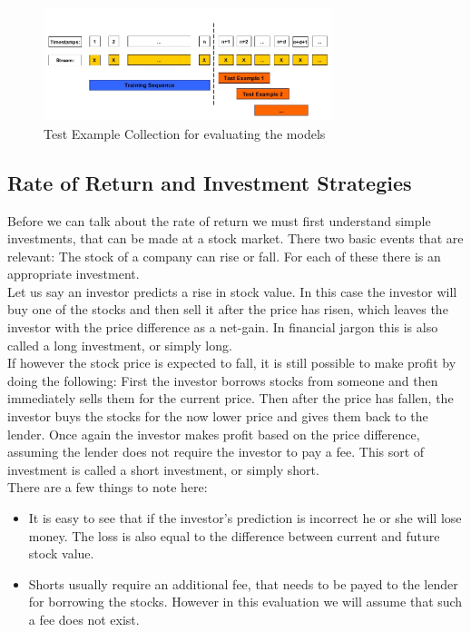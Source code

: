 \begin{figure}[h]
	\centering
  	\includegraphics[width=0.75\textwidth]{testData}
	\caption{Test Example Collection for evaluating the models}
	\label{fig_testData}
\end{figure}

\subsection{Rate of Return and Investment Strategies}
\label{subsec_investmentStrageties}
Before we can talk about the rate of return we must first understand simple investments, that can be made at a stock market. There two basic events that are relevant: The stock of a company can rise or fall. For each of these there is an appropriate investment. \\
Let us say an investor predicts a rise in stock value. In this case the investor will buy one of the stocks and then sell it after the price has risen, which leaves the investor with the price difference as a net-gain. In financial jargon this is also called a long investment, or simply long. \\
If however the stock price is expected to fall, it is still possible to make profit by doing the following: First the investor borrows stocks from someone and then immediately sells them for the current price. Then after the price has fallen, the investor buys the stocks for the now lower price and gives them back to the lender. Once again the investor makes profit based on the price difference, assuming the lender does not require the investor to pay a fee. This sort of investment is called a short investment, or simply short. \\
There are a few things to note here:
\begin{itemize}
	\item It is easy to see that if the investor's prediction is incorrect he or she will lose money. The loss is also equal to the difference between current and future stock value.
	\item Shorts usually require an additional fee, that needs to be payed to the lender for borrowing the stocks. However in this evaluation we will assume that such a fee does not exist.
\end{itemize}

